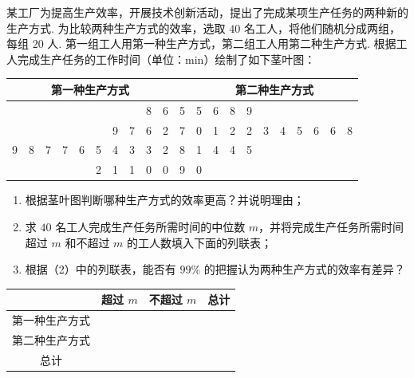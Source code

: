 \begin{problem}
某工厂为提高生产效率，开展技术创新活动，提出了完成某项生产任务的两种新的生产方式. 为比较两种生产方式的效率，选取 \(40\) 名工人，将他们随机分成两组，每组 \(20\) 人. 第一组工人用第一种生产方式，第二组工人用第二种生产方式. 根据工人完成生产任务的工作时间（单位：\(\mathrm{min}\)）绘制了如下茎叶图：

\begin{center}
\begin{tabular}{rrrrrrrrrr|c|llllllllll}
\multicolumn{10}{c|}{第一种生产方式} & & \multicolumn{10}{c}{第二种生产方式} \\
\hline
 &  &  &  &  &  &  &  & 8 & 6 & 5 & 5 & 6 & 8 & 9 &  &  &  &  &  \\
 &  &  &  &  &  & 9 & 7 & 6 & 2 & 7 & 0 & 1 & 2 & 2 & 3 & 4 & 5 & 6 & 6 & 8 \\
9 & 8 & 7 & 7 & 6 & 5 & 4 & 3 & 3 & 2 & 8 & 1 & 4 & 4 & 5 &  &  &  &  &  \\
 &  &  &  &  & 2 & 1 & 1 & 0 & 0 & 9 & 0 &  &  &  &  &  &  &  &  \\
\end{tabular}
\end{center}

\begin{enumerate}
    \item 根据茎叶图判断哪种生产方式的效率更高？并说明理由；
    \item 求 \(40\) 名工人完成生产任务所需时间的中位数 \(m\)，并将完成生产任务所需时间超过 \(m\) 和不超过 \(m\) 的工人数填入下面的列联表；
    \item 根据（2）中的列联表，能否有 \(99\%\) 的把握认为两种生产方式的效率有差异？
\end{enumerate}

\begin{center}
\begin{tabular}{c|cc|c}
 & 超过 \(m\) & 不超过 \(m\) & 总计 \\
\hline
第一种生产方式 &  &  &  \\
第二种生产方式 &  &  &  \\
\hline
总计 &  &  &  \\
\end{tabular}
\end{center}
\end{problem}

